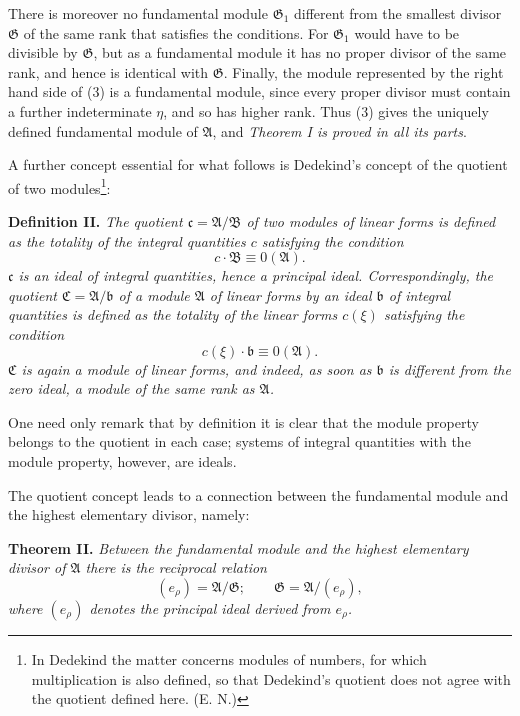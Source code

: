 \documentclass[11pt]{article}
\newcommand{\Amod}{\mathfrak A}
\newcommand{\Bmod}{\mathfrak B}
\newcommand{\Gmod}{\mathfrak G}
\newcommand{\bb}{\mathfrak b}
\newcommand{\cc}{\mathfrak c}
\newcommand{\zero}[1]{\equiv 0(#1)}
\begin{document}
There is moreover no fundamental module $\Gmod_1$ different from the smallest divisor $\Gmod$ of the same rank that satisfies the conditions. For $\Gmod_1$ would have to be divisible by $\Gmod$, but as a fundamental module it has no proper divisor of the same rank, and hence is identical with $\Gmod$. Finally, the module represented by the right hand side of (3) is a fundamental module, since every proper divisor must contain a further indeterminate $\eta$, and so has higher rank. Thus (3) gives the uniquely defined fundamental module of $\Amod$, and \emph{Theorem I is proved in all its parts}.

A further concept essential for what follows is Dedekind's concept of the quotient of two modules\footnote{In Dedekind the matter concerns modules of numbers, for which multiplication is also defined, so that Dedekind's quotient does not agree with the quotient defined here. (E. N.)}:

\medskip
\noindent\textbf{Definition II.} \emph{The quotient $\cc=\Amod/\Bmod$ of two modules of linear forms is defined as the totality of the integral quantities $c$ satisfying the condition}
\[
 c\cdot\Bmod\zero{\Amod}.
\]
\emph{$\cc$ is an ideal of integral quantities, hence a principal ideal. Correspondingly, the quotient $\mathfrak C=\Amod/\bb$ of a module $\Amod$ of linear forms by an ideal $\bb$ of integral quantities is defined as the totality of the linear forms $c(\xi)$ satisfying the condition}
\[
 c(\xi)\cdot\bb\zero{\Amod}.
\]
\emph{$\mathfrak C$ is again a module of linear forms, and indeed, as soon as $\bb$ is different from the zero ideal, a module of the same rank as $\Amod$.}

One need only remark that by definition it is clear that the module property belongs to the quotient in each case; systems of integral quantities with the module property, however, are ideals.

The quotient concept leads to a connection between the fundamental module and the highest elementary divisor, namely:

\medskip
\noindent\textbf{Theorem II.} \emph{Between the fundamental module and the highest elementary divisor of $\Amod$ there is the reciprocal relation}
\begin{equation}
 (e_\rho)=\Amod/\Gmod;\qquad \Gmod=\Amod/(e_\rho),
\tag{5}
\end{equation}
\emph{where $(e_\rho)$ denotes the principal ideal derived from $e_\rho$.}
\end{document}

